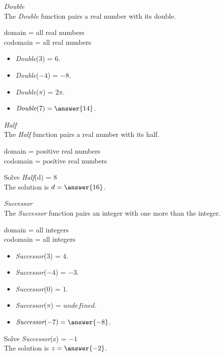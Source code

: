 \documentclass{ximera}
\begin{document}
\begin{example} \textit{Double} \\
The \textit{Double} function pairs a real number with its double.

domain = all real numbers  \\ 
codomain = all real numbers


\begin{itemize}
\item \textit{Double}($3$) = $6$.
\item \textit{Double}($-4$) = $-8$.
\item \textit{Double}($\pi$) = $2 \pi$.

\item $\textit{Double}(7) = \answer{14}$.
\end{itemize}

\end{example} 







\begin{example} \textit{Half} \\
The \textit{Half} function pairs a real number with its half.

domain = positive real numbers  \\ 
codomain = positive real numbers


Solve \textit{Half}(d) = $8$ \\

The solution is $d = \answer{16}$.

\end{example} 







\begin{example} \textit{Successor} \\
The \textit{Successor} function pairs an integer with one more than the integer.

domain = all integers  \\ 
codomain = all integers


\begin{itemize}
\item \textit{Successor}($3$) = $4$.
\item \textit{Successor}($-4$) = $-3$.
\item \textit{Successor}($0$) = $1$.
\item \textit{Successor}($\pi$) = $undefined$.

\item $\textit{Successor}(-7) = \answer{-8}$.
\end{itemize}


Solve \textit{Successor}(z) = $-1$ \\

The solution is $z = \answer{-2}$.

\end{example} 
\end{document}
